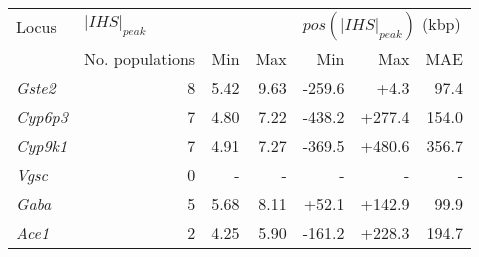 \begin{tabular}{lrrrrrr}
\toprule
           Locus & \multicolumn{3}{l}{$|IHS|_{peak}$} & \multicolumn{3}{l}{$pos(|IHS|_{peak})$ (kbp)} \\
                 & No. populations &  Min &  Max &                       Min &    Max &   MAE \\
\midrule
  \textit{Gste2} &               8 & 5.42 & 9.63 &                    -259.6 &   +4.3 &  97.4 \\
 \textit{Cyp6p3} &               7 & 4.80 & 7.22 &                    -438.2 & +277.4 & 154.0 \\
 \textit{Cyp9k1} &               7 & 4.91 & 7.27 &                    -369.5 & +480.6 & 356.7 \\
   \textit{Vgsc} &               0 &    - &    - &                         - &      - &     - \\
   \textit{Gaba} &               5 & 5.68 & 8.11 &                     +52.1 & +142.9 &  99.9 \\
   \textit{Ace1} &               2 & 4.25 & 5.90 &                    -161.2 & +228.3 & 194.7 \\
\bottomrule
\end{tabular}
